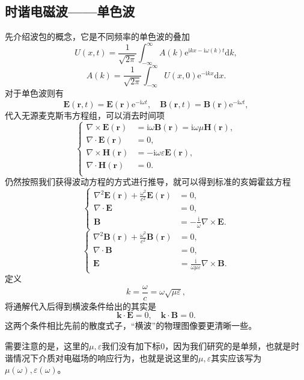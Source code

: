 \documentclass[UTF8]{ctexbook}
\newcommand{\e}{\mathrm{e}}
\renewcommand{\d}{\mathrm{d}}
\renewcommand{\b}{\boldsymbol}
\renewcommand{\i}{\mathrm{i}}
\numberwithin{equation}{chapter}
\begin{document}
	\subsection{时谐电磁波——单色波}
	先介绍波包的概念，它是不同频率的单色波的叠加
	\[U(x,t)=\frac{1}{\sqrt{2\pi}}\int_{-\infty}^\infty A(k)\e^{\i kx-\i\omega(k) t}\d k,\]
	\[A(k)=\frac{1}{\sqrt{2\pi}}\int_{-\infty}^{\infty}U(x,0)\e^{-\i kx}\d x.\]
	对于单色波则有
	\[\b{E}(\b{r},t)=\b{E}(\b{r})\e^{-\i\omega t},\quad \b{B}(\b{r},t)=\b{B}(\b{r})\e^{-\i\omega t},\]
	代入无源麦克斯韦方程组，可以消去时间项
	\[\left\{\begin{aligned}
		\nabla\times\b{E}(\b{r})&=\i\omega\b{B}(\b{r})=\i\omega\mu\b{H}(\b{r}), \\
		\nabla\cdot\b{E}(\b{r})&=0,  \\
		\nabla\times\b{H}(\b{r})&=-\i\omega\varepsilon\b{E}(\b{r}), \\
		\nabla\cdot\b{H}(\b{r})&=0.\\
	\end{aligned}\right.\]
	仍然按照我们获得波动方程的方式进行推导，就可以得到标准的亥姆霍兹方程
	\[\left\{\begin{aligned}
		\nabla^2\b{E}(\b{r})+\frac{\omega^2}{c^2}\b{E}(\b{r})&=0, \\
		\nabla\cdot\b{E}&=0, \\
		\b{B}&=-\frac{\i}{\omega}\nabla\times\b{E}.
	\end{aligned}\right.\]
	\[\left\{\begin{aligned}
	\nabla^2\b{B}(\b{r})+\frac{\omega^2}{c^2}\b{B}(\b{r})&=0, \\
	\nabla\cdot\b{B}&=0, \\
	\b{E}&=\frac{\i}{\omega\mu\varepsilon}\nabla\times\b{B}.
	\end{aligned}\right.\]	
	定义
	\[k=\frac{\omega}{c}=\omega\sqrt{\mu\varepsilon},\]
	将通解代入后得到横波条件给出的其实是
	\[\b{k}\cdot\b{E}=0,\quad \b{k}\cdot\b{B}=0.\]
	这两个条件相比先前的散度式子，“横波”的物理图像要更清晰一些。
	
	需要注意的是，这里的$\mu,\varepsilon$我们没有加下标$0$，因为我们研究的是单频，也就是时谐情况下介质对电磁场的响应行为，也就是说这里的$\mu,\varepsilon$其实应该写为$\mu(\omega),\varepsilon(\omega)$。
	
\end{document}
